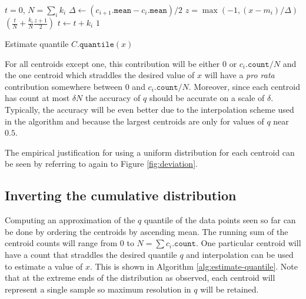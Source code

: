 \documentclass[11pt]{amsart}
\begin{document}
 \begin{algorithm}[b]
 \label{alg:quantile}
\SetNoFillComment
{}
$t = 0$, $N = \sum_i k_i$\;
 {
     {
      $\Delta \gets (c_{i+1}.\mathtt{mean} - c_i.\mathtt{mean})/2$\;
    } 
    $z = \max(-1, (x-m_i)/\Delta)$\;
   {
    \Return $( \frac{t}{N} + \frac{k_i} N \frac{z+1} {2})$
  }
  $t \gets t + k_i$\;
}
\Return $1$
\caption{Estimate quantile $C.\mathtt{quantile}(x)$}
\end{algorithm}

For all centroids except one, this contribution will be either $0$ or $c_i.\mathtt{count}/N$ and the one centroid which straddles the desired value of $x$ will have a {\em pro rata} contribution somewhere between $0$ and $c_i.\mathtt{count}/N$. Moreover, since each centroid has count at most $\delta N$ the accuracy of $q$ should be accurate on a scale of $\delta$.  Typically, the accuracy will be even better due to the interpolation scheme used in the algorithm and because the largest centroids are only for values of $q$ near $0.5$.

The empirical justification for using a uniform distribution for each centroid can be seen by referring to again to Figure \ref{fig:deviation}.  

\subsection{Inverting the cumulative distribution}
Computing an approximation of the $q$ quantile of the data points seen so far can be done by ordering the centroids by ascending mean.  The running sum of the centroid counts will range from $0$ to $N=\sum c_i.\mathtt{count}$.  One particular centroid will have a count that straddles the desired quantile $q$ and interpolation can be used to estimate a value of $x$.  This is shown in Algorithm \ref{alg:estimate-quantile}.   Note that at the extreme ends of the distribution as observed, each centroid will represent a single sample so maximum resolution in $q$ will be retained.
\end{document}
